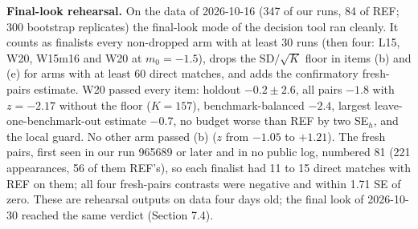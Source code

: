 \documentclass[
]{article}
\begin{document}
\textbf{Final-look rehearsal.} On the data of 2026-10-16 (347 of our
runs, 84 of REF; 300 bootstrap replicates) the final-look mode of the
decision tool ran cleanly. It counts as finalists every non-dropped arm
with at least 30 runs (then four: L15, W20, W15m16 and W20 at
\(m_0 = -1.5\)), drops the \(\mathrm{SD}/\sqrt{K}\) floor in items (b)
and (e) for arms with at least 60 direct matches, and adds the
confirmatory fresh-pairs estimate. W20 passed every item: holdout
\(-0.2 \pm 2.6\), all pairs \(-1.8\) with \(z = -2.17\) without the
floor (\(K = 157\)), benchmark-balanced \(-2.4\), largest
leave-one-benchmark-out estimate \(-0.7\), no budget worse than REF by
two SE\(_h\), and the local guard. No other arm passed (b) (\(z\) from
\(-1.05\) to \(+1.21\)). The fresh pairs, first seen in our run 965689
or later and in no public log, numbered 81 (221 appearances, 56 of them
REF's), so each finalist had 11 to 15 direct matches with REF on them;
all four fresh-pairs contrasts were negative and within 1.71 SE of zero.
These are rehearsal outputs on data four days old; the final look of
2026-10-30 reached the same verdict (Section 7.4).
\end{document}
